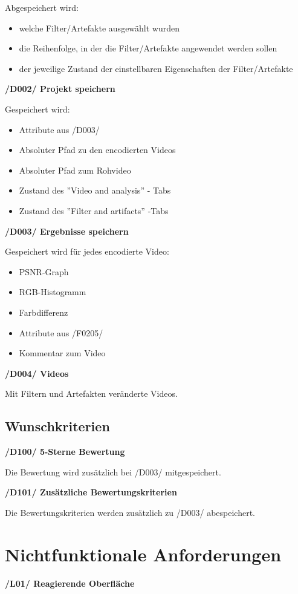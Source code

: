 \documentclass[parskip=full]{scrartcl}
\begin{document}
Abgespeichert wird:
\begin{itemize}
\item welche Filter/Artefakte ausgewählt wurden
\item die Reihenfolge, in der die Filter/Artefakte angewendet werden sollen
\item der jeweilige Zustand der einstellbaren Eigenschaften der Filter/Artefakte
\end{itemize}


\textbf{/D002/ Projekt speichern}

Gespeichert wird:
\begin{itemize}
\item Attribute aus /D003/
\item Absoluter Pfad zu den encodierten Videos
\item Absoluter Pfad zum Rohvideo
\item Zustand des ''Video and analysis'' - Tabs
\item Zustand des ''Filter and artifacts'' -Tabs
\end{itemize}

\textbf{/D003/ Ergebnisse speichern}

Gespeichert wird für jedes encodierte Video:
\begin{itemize}
\item PSNR-Graph
\item RGB-Histogramm
\item Farbdifferenz
\item Attribute aus /F0205/
\item Kommentar zum Video
\end{itemize}

\textbf{/D004/ Videos}

Mit Filtern und Artefakten veränderte Videos.

\subsection{Wunschkriterien}
\textbf{/D100/ 5-Sterne Bewertung}

Die Bewertung wird zusätzlich bei /D003/ mitgespeichert.

\textbf{/D101/ Zusätzliche Bewertungskriterien}

Die Bewertungskriterien werden zusätzlich zu /D003/ abespeichert.


\newpage
\section{Nichtfunktionale Anforderungen}
\textbf{/L01/ Reagierende Oberfläche}
\end{document}
